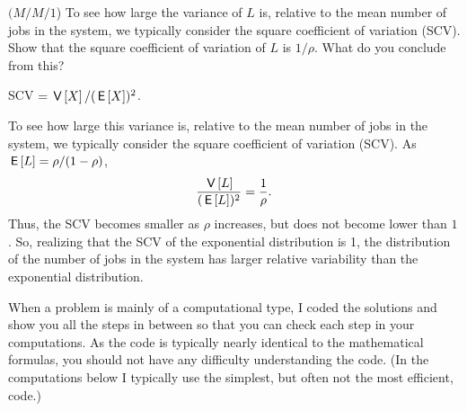 \begin{exercise}$(M/M/1$) 
To see how large the variance of $L$ is, relative to the mean number of jobs
in the system, we typically consider the square coefficient of
variation (SCV). Show that the square coefficient of variation of $L$ is $1/\rho$. What do you conclude from this?
\begin{hint}
  SCV  $=\,\mathsf{V}\left[X\right]/(\,\mathsf{E}\left[X\right])^2$. 
\end{hint}
  \begin{solution}
To see how large this variance is, relative to the mean number of jobs
in the system, we typically consider the square coefficient of
variation (SCV). As $\,\mathsf{E}\left[L\right] = \rho/(1-\rho)$,
\begin{equation*}
  \frac{\,\mathsf{V}\left[L\right]}{(\,\mathsf{E}\left[L\right])^2} = \frac 1 \rho.
\end{equation*}
Thus, the SCV becomes smaller as $\rho$ increases, but does not become
lower than $1$. So, realizing that the SCV of the exponential
distribution is 1, the distribution of the number of jobs in the
system has larger relative variability than the exponential
distribution.
  \end{solution}
\end{exercise}

When a problem is mainly of a computational type, I coded the solutions and show you all the steps in between so that you can check each step in your computations. As the code is typically nearly identical to the mathematical formulas, you should not have any difficulty
understanding the code. (In the computations below I typically use the simplest, but often
not the most efficient, code.)

